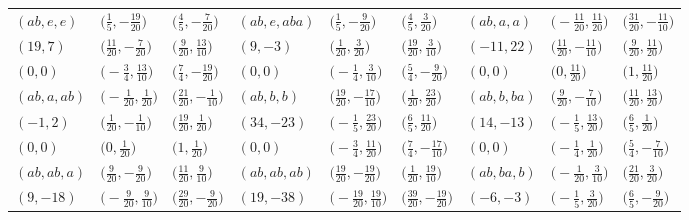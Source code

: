 \documentclass[10pt,a4paper]{amsart}
\theoremstyle{definition}
\numberwithin{equation}{section}
\begin{document}
\begin{landscape}
\begin{table}[th]\centering\small
\begin{tabular}{|lll|lll|lll|}
 \hline
$(ab, e, e)$ & $\bigl(\frac{1}{5}, -\frac{19}{20}\bigr)$ & $\bigl(\frac{4}{5}, -\frac{7}{20}\bigr)$ & $(ab, e, aba)$ & $\bigl(\frac{1}{5}, -\frac{9}{20}\bigr)$ & $\bigl(\frac{4}{5}, \frac{3}{20}\bigr)$ & $(ab, a, a)$ & $\bigl(-\frac{11}{20}, \frac{11}{20}\bigr)$ & $\bigl(\frac{31}{20}, -\frac{11}{10}\bigr)$ \\
$(19, 7)$ & $\bigl(\frac{11}{20}, -\frac{7}{20}\bigr)$ & $\bigl(\frac{9}{20}, \frac{13}{10}\bigr)$ & $(9, -3)$ & $\bigl(\frac{1}{20}, \frac{3}{20}\bigr)$ & $\bigl(\frac{19}{20}, \frac{3}{10}\bigr)$ & $(-11, 22)$ & $\bigl(\frac{11}{20}, -\frac{11}{10}\bigr)$ & $\bigl(\frac{9}{20}, \frac{11}{20}\bigr)$
\\
$(0, 0)$ & $\bigl(-\frac{3}{4}, \frac{13}{10}\bigr)$ & $\bigl(\frac{7}{4}, -\frac{19}{20}\bigr)$ & $(0, 0)$ & $\bigl(-\frac{1}{4}, \frac{3}{10}\bigr)$ & $\bigl(\frac{5}{4}, -\frac{9}{20}\bigr)$ & $(0, 0)$ & $\bigl(0, \frac{11}{20}\bigr)$ & $\bigl(1, \frac{11}{20}\bigr)$
\\\hline
$(ab, a, ab)$ & $\bigl(-\frac{1}{20}, \frac{1}{20}\bigr)$ & $\bigl(\frac{21}{20}, -\frac{1}{10}\bigr)$ & $(ab, b, b)$ & $\bigl(\frac{19}{20}, -\frac{17}{10}\bigr)$ & $\bigl(\frac{1}{20}, \frac{23}{20}\bigr)$ & $(ab, b, ba)$ & $\bigl(\frac{9}{20}, -\frac{7}{10}\bigr)$ & $\bigl(\frac{11}{20}, \frac{13}{20}\bigr)$
\\
$(-1, 2)$ & $\bigl(\frac{1}{20}, -\frac{1}{10}\bigr)$ & $\bigl(\frac{19}{20}, \frac{1}{20}\bigr)$ & $(34, -23)$ & $\bigl(-\frac{1}{5}, \frac{23}{20}\bigr)$ & $\bigl(\frac{6}{5}, \frac{11}{20}\bigr)$ & $(14, -13)$ & $\bigl(-\frac{1}{5}, \frac{13}{20}\bigr)$ & $\bigl(\frac{6}{5}, \frac{1}{20}\bigr)$
\\
$(0, 0)$ & $\bigl(0, \frac{1}{20}\bigr)$ & $\bigl(1, \frac{1}{20}\bigr)$ & $(0, 0)$ & $\bigl(-\frac{3}{4}, \frac{11}{20}\bigr)$ & $\bigl(\frac{7}{4}, -\frac{17}{10}\bigr)$ & $(0, 0)$ & $\bigl(-\frac{1}{4}, \frac{1}{20}\bigr)$ & $\bigl(\frac{5}{4}, -\frac{7}{10}\bigr)$
\\\hline
$(ab, ab, a)$ & $\bigl(\frac{9}{20}, -\frac{9}{20}\bigr)$ & $\bigl(\frac{11}{20}, \frac{9}{10}\bigr)$ & $(ab, ab, ab)$ & $\bigl(\frac{19}{20}, -\frac{19}{20}\bigr)$ & $\bigl(\frac{1}{20}, \frac{19}{10}\bigr)$ & $(ab, ba, b)$ & $\bigl(-\frac{1}{20}, \frac{3}{10}\bigr)$ & $\bigl(\frac{21}{20}, \frac{3}{20}\bigr)$
\\
$(9, -18)$ & $\bigl(-\frac{9}{20}, \frac{9}{10}\bigr)$ & $\bigl(\frac{29}{20}, -\frac{9}{20}\bigr)$ & $(19, -38)$ & $\bigl(-\frac{19}{20}, \frac{19}{10}\bigr)$ & $\bigl(\frac{39}{20}, -\frac{19}{20}\bigr)$ & $(-6, -3)$ & $\bigl(-\frac{1}{5}, \frac{3}{20}\bigr)$ & $\bigl(\frac{6}{5}, -\frac{9}{20}\bigr)$

\end{tabular}
\end{table}
\end{landscape}
\end{document}

